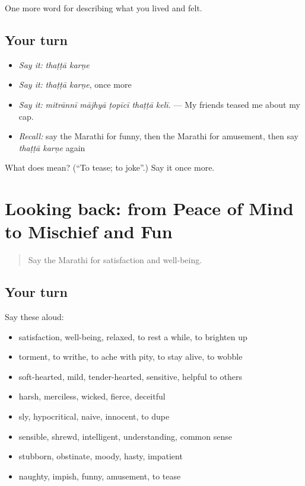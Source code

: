 \begin{grammarlens}[title={What you've built}]
One more word for describing what you lived and felt.
\end{grammarlens}

\subsection*{Your turn}
\begin{itemize}
\raggedright
  \item \emph{Say it:} \emph{thaṭṭā karṇe}
  \item \emph{Say it:} \emph{thaṭṭā karṇe}, once more
  \item \emph{Say it:} \emph{mitrānnī mājhyā ṭopīcī thaṭṭā kelī.} — My friends teased me about my cap.
  \item \emph{Recall:} say the Marathi for funny, then the Marathi for amusement, then say \emph{thaṭṭā karṇe} again
\end{itemize}

\begin{tcolorbox}[breakable,colback=teal!4,colframe=teal!35!black,title={Before you move on}]
What does   mean? (\textquotedblleft{}To tease; to joke\textquotedblright{}.) Say it once more.
\end{tcolorbox}
\section[(dialogue)]{Looking back: from Peace of Mind to Mischief and Fun}

\label{lesson:MR-R473-review-466-473}



\begin{quote}
Say the Marathi for satisfaction and well-being.
\end{quote}

\subsection*{Your turn}
Say these aloud:

\begin{itemize}
\raggedright
  \item satisfaction, well-being, relaxed, to rest a while, to brighten up
  \item torment, to writhe, to ache with pity, to stay alive, to wobble
  \item soft-hearted, mild, tender-hearted, sensitive, helpful to others
  \item harsh, merciless, wicked, fierce, deceitful
  \item sly, hypocritical, naive, innocent, to dupe
  \item sensible, shrewd, intelligent, understanding, common sense
  \item stubborn, obstinate, moody, hasty, impatient
  \item naughty, impish, funny, amusement, to tease
\end{itemize}

